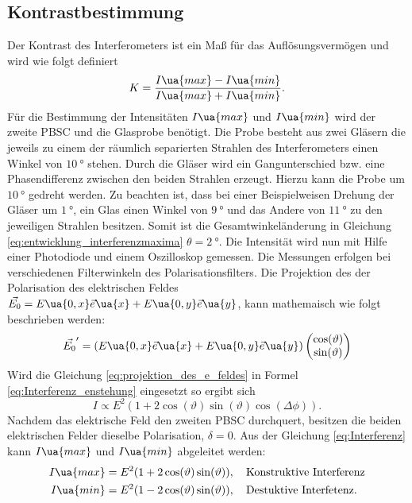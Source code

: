 \subsection{Kontrastbestimmung}\label{sec:Kontrastbestimmung}
Der Kontrast des Interferometers ist ein Maß für das Auflösungsvermögen und wird
wie folgt definiert
\begin{equation}
  \label{eq:kontrast}
  K = \frac{I\ua{max} - I\ua{min}}{I\ua{max}+I\ua{min}}.
\end{equation}
Für die Bestimmung der Intensitäten $I\ua{max}$ und $I\ua{min}$ wird der zweite
PBSC und die Glasprobe benötigt. Die Probe
besteht aus zwei Gläsern die jeweils zu einem der räumlich separierten Strahlen
des Interferometers einen Winkel von $\SI{10}{\degree}$ stehen. Durch die Gläser wird
ein Gangunterschied bzw. eine Phasendifferenz zwischen den beiden Strahlen erzeugt.
Hierzu kann die Probe um $\SI{10}{\degree}$ gedreht werden. Zu beachten ist, dass
bei einer Beispielweisen Drehung der Gläser um $\SI{1}{\degree}$, ein Glas
einen Winkel von $\SI{9}{\degree}$ und das Andere von $\SI{11}{\degree}$ zu den jeweiligen
Strahlen besitzen. Somit ist die Gesamtwinkeländerung in Gleichung \eqref{eq:entwicklung_interferenzmaxima} $\theta = \SI{2}{\degree}$.
Die Intensität wird nun mit Hilfe einer Photodiode und einem Oszilloskop
gemessen. Die Messungen erfolgen bei verschiedenen Filterwinkeln des Polarisationsfilters.
Die Projektion des der Polarisation des elektrischen Feldes $\vec{E_0}=E\ua{0,x}\vec{e}\ua{x}
+E\ua{0,y}\vec{e}\ua{y}$, kann mathemaisch wie folgt beschrieben werden:
\begin{equation}
  \label{eq:projektion_des_e_feldes}
  \vec{E_0}'=\left(E\ua{0,x}\vec{e}\ua{x}+E\ua{0,y}\vec{e}\ua{y}\right) \begin{pmatrix} \cos(\vartheta) \\ \sin(\vartheta) \end{pmatrix}
\end{equation}
Wird die Gleichung \eqref{eq:projektion_des_e_feldes} in Formel \eqref{eq:Interferenz_enstehung}
eingesetzt so ergibt sich
\begin{equation}
  \label{eq:Interferenz}
  I\propto E^2(1+2\cos(\vartheta)\sin(\vartheta)\cos(\Delta\phi)).
\end{equation}
Nachdem das elektrische Feld den zweiten PBSC durchquert, besitzen die beiden elektrischen Felder
dieselbe Polarisation, $\delta = 0$. Aus der Gleichung \eqref{eq:Interferenz}
kann $I\ua{max}$ und $I\ua{min}$ abgeleitet werden:
\begin{align}
  \label{eq:I_max_und_I_min}
  \begin{aligned}
  I\ua{max} & = E^2(1+2\cos(\vartheta)\sin(\vartheta)), \quad \text{Konstruktive Interferenz} \\
  I\ua{min} & = E^2(1-2\cos(\vartheta)\sin(\vartheta)), \quad \text{Destuktive Interfetenz}.
\end{aligned}
\end{align}
